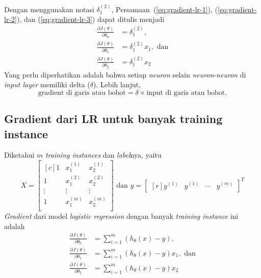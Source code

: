\documentclass[12pt]{article}
\begin{document}
Dengan menggunakan notasi $\delta^{(2)}_1$, Persamaan~(\ref{eq:gradient-lr-1}), (\ref{eq:gradient-lr-2}), dan (\ref{eq:gradient-lr-3}) dapat ditulis menjadi
\begin{align}
	\frac{\partial J(\theta)}{\partial \theta_0} &= \delta^{(2)}_1, \label{eq:gradient-lr-delta-1} \\
	\frac{\partial J(\theta)}{\partial \theta_1} &= \delta^{(2)}_1 x_1, \text{ dan} \label{eq:gradient-lr-delta-2} \\	
	\frac{\partial J(\theta)}{\partial \theta_2} &= \delta^{(2)}_1 x_2 \label{eq:gradient-lr-delta-3}	
\end{align}
Yang perlu diperhatikan adalah bahwa setiap \textit{neuron} selain \textit{neuron}-\textit{neuron} di \textit{input layer} memiliki delta ($\delta$). Lebih lanjut,
\begin{equation*}
	\text{gradient di garis atau bobot} =  \delta \times \text{input di garis atau bobot}.
\end{equation*}

\subsection*{Gradient dari LR untuk banyak training instance}
Diketahui $m$ \textit{training instances} dan \textit{label}nya, yaitu 
\begin{equation*}
X = \begin{bmatrix}[c]
	1       & x^{(1)}_1 & x^{(1)}_2 \\
	1       & x^{(2)}_1 & x^{(2)}_2 \\	
	\vdots  & \vdots    & \vdots \\
	1       & x^{(m)}_1 & x^{(m)}_2 \\		 
\end{bmatrix} \text{ dan } y = \begin{bmatrix}[r]
	y^{(1)} & y^{(1)} & \cdots & y^{(m)}
\end{bmatrix}^T	
\end{equation*} 
\textit{Gradient} dari model \textit{logistic regression} dengan banyak \textit{training instance} ini adalah
\begin{align}
	\frac{\partial J(\theta)}{\partial \theta_0} &= \sum_{i=1}^{m}{(h_\theta(x) - y)}, \label{eq:gradient-lr-multi-1} \\
	\frac{\partial J(\theta)}{\partial \theta_1} &= \sum_{i=1}^{m}{(h_\theta(x) - y) x_1}, \text{ dan} \label{eq:gradient-lr-multi-2} \\	
	\frac{\partial J(\theta)}{\partial \theta_2} &= \sum_{i=1}^{m}{(h_\theta(x) - y) x_2} \label{eq:gradient-lr-multi-3}	
\end{align}
\end{document}
